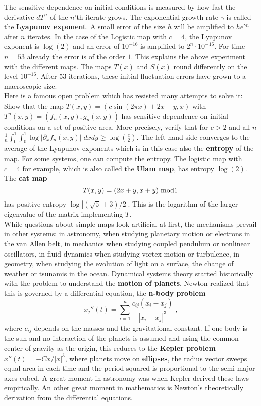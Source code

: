 \documentclass[12pt]{amsart}
\newcounter{example}    \def\example#1{ \item \fontsize{12}{15} \selectfont #1 \fontsize{12}{15} \selectfont }
\begin{document}
The sensitive dependence on initial conditions is measured by how fast the derivative $dT^n$
of the $n$'th iterate grows. The exponential growth rate $\gamma$ is called the {\bf Lyapunov exponent}. 
A small error of the size $h$ will be amplified to $h e^{\gamma n}$ after $n$ iterates. In 
the case of the Logistic map with $c=4$, the Lyapunov exponent is $\log(2)$ and an error of 
$10^{-16}$ is amplified to $2^n \cdot 10^{-16}$. For time $n=53$ already the error is of the order $1$. This explains the above
experiment with the different maps. The maps $T(x)$ and $S(x)$ round differently on the level $10^{-16}$. 
After 53 iterations, these initial fluctuation errors have grown to a macroscopic size. \\
Here is a famous open problem which has resisted many attempts to solve it: 
Show that the map $T(x,y) = (c \sin(2\pi x) + 2 x -y, x)$ with $T^n(x,y) = (f_n(x,y),g_n(x,y))$
has sensitive dependence on initial conditions on a set of positive area. 
More precisely, verify that for $c>2$ and all $n$
$\frac{1}{n} \int_0^1 \int_0^1 \log|\partial_x f_n(x,y)| \; dx dy \geq \log(\frac{c}{2})$. 
The left hand side converges to the average of the Lyapunov exponents which 
is in this case also the {\bf entropy} of the map. For some systems, one can compute the entropy. 
The logistic map with $c=4$ for example, which is also called the {\bf Ulam map}, has 
entropy $\log(2)$. The {\bf cat map} 
$$  T(x,y) = (2x+y,x+y)  \; {\rm mod 1} \;   $$
has positive entropy 
$\log|(\sqrt{5}+3)/2|$. This is the logarithm of the larger eigenvalue of the 
matrix implementing $T$. \\ 
While questions about simple maps look artificial at first, the mechanisms
prevail in other systems: in astronomy, when studying planetary motion or electrons in the 
van Allen belt, in mechanics when studying coupled pendulum or nonlinear oscillators, in fluid dynamics 
when studying vortex motion or turbulence, in geometry, when studying the evolution of light on a 
surface, the change of weather or tsunamis in the ocean.
Dynamical systems theory started historically with the problem to understand the {\bf motion of planets}. 
Newton realized that this is governed by a differential equation, the {\bf n-body problem}
$$ x_j''(t) = \sum_{i=1}^n \frac{c_{ij} (x_i-x_j)}{|x_i-x_j|^3}  \; , $$
where $c_{ij}$ depends on the masses and the gravitational constant. If one body is the sun and 
no interaction of the planets is assumed and using the common center of gravity as the origin, 
this reduces to the {\bf Kepler problem}
$x''(t) = -C x/|x|^3$, where planets move on {\bf ellipses}, the radius vector sweeps equal area in each time 
and the period squared is proportional to the semi-major axes cubed. A great moment in astronomy was when
Kepler derived these laws empirically. An other great moment in mathematics is Newton's
theoretically derivation from the differential equations.
\end{document}
